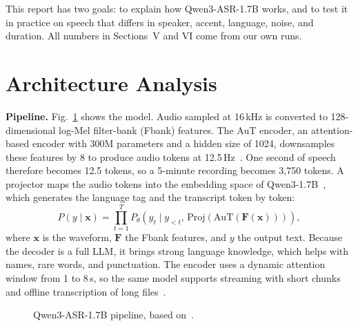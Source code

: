 \documentclass[conference]{IEEEtran}
\begin{document}
This report has two goals: to explain how Qwen3-ASR-1.7B works, and to test it in practice on speech that differs in speaker, accent, language, noise, and duration. All numbers in Sections~V and VI come from our own runs.

\section{Architecture Analysis}
\textbf{Pipeline.} Fig.~\ref{fig:pipe} shows the model. Audio sampled at 16\,kHz is converted to 128-dimensional log-Mel filter-bank (Fbank) features. The AuT encoder, an attention-based encoder with 300M parameters and a hidden size of 1024, downsamples these features by 8 to produce audio tokens at 12.5\,Hz~\cite{qwen3asr}. One second of speech therefore becomes 12.5 tokens, so a 5-minute recording becomes 3,750 tokens. A projector maps the audio tokens into the embedding space of Qwen3-1.7B~\cite{qwen3}, which generates the language tag and the transcript token by token:
\begin{equation}
P(y\mid\mathbf{x})=\prod_{t=1}^{T}P_\theta\!\left(y_t\mid y_{<t},\,\mathrm{Proj}(\mathrm{AuT}(\mathbf{F}(\mathbf{x})))\right),
\end{equation}
where $\mathbf{x}$ is the waveform, $\mathbf{F}$ the Fbank features, and $y$ the output text. Because the decoder is a full LLM, it brings strong language knowledge, which helps with names, rare words, and punctuation. The encoder uses a dynamic attention window from 1 to 8\,s, so the same model supports streaming with short chunks and offline transcription of long files~\cite{qwen3asr}.

\begin{figure}[t]
\centering
{}
\caption{Qwen3-ASR-1.7B pipeline, based on~\cite{qwen3asr}.}
\label{fig:pipe}
\end{figure}
\end{document}

